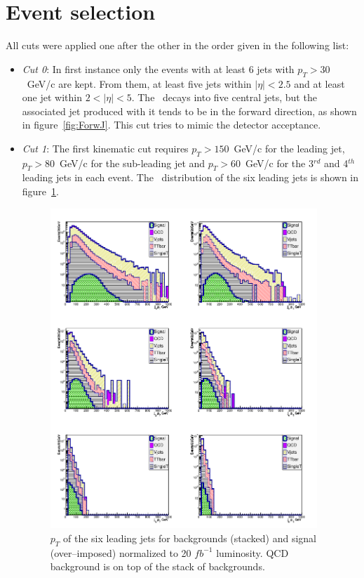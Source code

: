 \section{Event selection}
\label{sec:Psel}

All cuts were applied one after the other in the order given in the following list:

\begin{itemize}

\item \textit{Cut 0}: In first instance only the events with at least 6 jets with ${p_T > 30}$~GeV/c are kept. From them, at least five jets within $|\eta|<2.5$ and at least one jet within $2<|\eta|<5$. The \Tp~decays into five central jets, but the associated jet produced with it tends to be in the forward direction, as shown in figure~\ref{fig:ForwJ}. This cut tries to mimic the detector acceptance.

\item \textit{Cut 1}: The first kinematic cut requires ${p_{T}>150}$~GeV/c for the leading jet, ${p_{T}>80}$~GeV/c for the sub-leading jet and ${p_{T}>60}$~GeV/c for the 3$^{rd}$ and 4$^{th}$ leading jets in each event. The \pt~distribution of the six leading jets is shown in figure~\ref{fig:Var1}.

\begin{figure}[!Hhtbp]
  \begin{center}
    \includegraphics[width=0.95\textwidth]{figs/Pheno/JetPt.png}
    \caption{$p_{T}$  of the six leading jets for backgrounds (stacked) and signal (over--imposed) normalized to 20 $fb^{-1}$ luminosity. QCD background is on top of the stack of backgrounds.}
    \label{fig:Var1}
  \end{center}
\end{figure}


\end{itemize}
